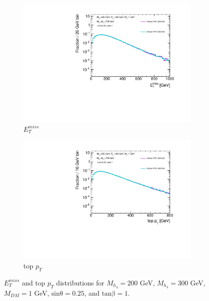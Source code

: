 \begin{figure} \centering
  \begin{subfigure}[b]{0.49\textwidth}           
    \includegraphics[width=\textwidth]{texinputs/04_grid/figures/DMHF/4v5flavour/MDM_1_Ma_200_MA_300_sinp_0.25_tanb_1.0_4F_v_5F/metlog.pdf}
    \caption{$E_{T}^{miss}$}
  \end{subfigure}
  \begin{subfigure}[b]{0.49\textwidth}
    \includegraphics[width=\textwidth]{texinputs/04_grid/figures/DMHF/4v5flavour/MDM_1_Ma_200_MA_300_sinp_0.25_tanb_1.0_4F_v_5F/topptlog.pdf}
    \caption{top $p_{T}$}
  \end{subfigure}
  \caption{$E_{T}^{miss}$ and top $p_{T}$ distributions for $M_{h_{4}}=200$ GeV, $M_{h_{3}}=300$ GeV, $M_{DM}=1$ GeV, $\mathrm{sin\theta}=0.25$, and $\mathrm{tan\beta}=1$.}
  \label{fig:4v5_Ma200_MA300}
\end{figure}

